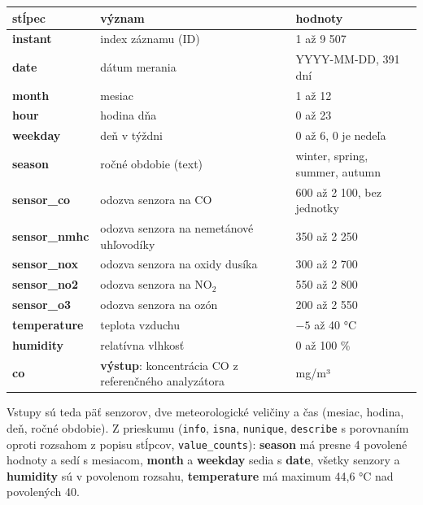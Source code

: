 \documentclass[11pt,a4paper]{article}
\begin{document}
\begin{center}
\small
\begin{tabular}{lll}
\hline
\textbf{stĺpec} & \textbf{význam} & \textbf{hodnoty} \\
\hline
\textbf{instant} & index záznamu (ID) & 1 až 9 507 \\
\textbf{date} & dátum merania & YYYY-MM-DD, 391 dní \\
\textbf{month} & mesiac & 1 až 12 \\
\textbf{hour} & hodina dňa & 0 až 23 \\
\textbf{weekday} & deň v týždni & 0 až 6, 0 je nedeľa \\
\textbf{season} & ročné obdobie (text) & winter, spring, summer, autumn \\
\textbf{sensor\_co} & odozva senzora na CO & 600 až 2 100, bez jednotky \\
\textbf{sensor\_nmhc} & odozva senzora na nemetánové uhľovodíky & 350 až 2 250 \\
\textbf{sensor\_nox} & odozva senzora na oxidy dusíka & 300 až 2 700 \\
\textbf{sensor\_no2} & odozva senzora na NO$_2$ & 550 až 2 800 \\
\textbf{sensor\_o3} & odozva senzora na ozón & 200 až 2 550 \\
\textbf{temperature} & teplota vzduchu & $-5$ až 40 °C \\
\textbf{humidity} & relatívna vlhkosť & 0 až 100 \% \\
\textbf{co} & \textbf{výstup}: koncentrácia CO z referenčného analyzátora & mg/m³ \\
\hline
\end{tabular}
\end{center}

Vstupy sú teda päť senzorov, dve meteorologické veličiny a čas (mesiac, hodina, deň, ročné obdobie).
Z prieskumu (\texttt{info}, \texttt{isna}, \texttt{nunique}, \texttt{describe} s porovnaním oproti rozsahom
z popisu stĺpcov, \texttt{value\_counts}): \textbf{season} má presne 4 povolené hodnoty a sedí s mesiacom,
\textbf{month} a \textbf{weekday} sedia s \textbf{date}, všetky senzory a \textbf{humidity} sú v povolenom
rozsahu, \textbf{temperature} má maximum 44,6 °C nad povolených 40.
\end{document}

